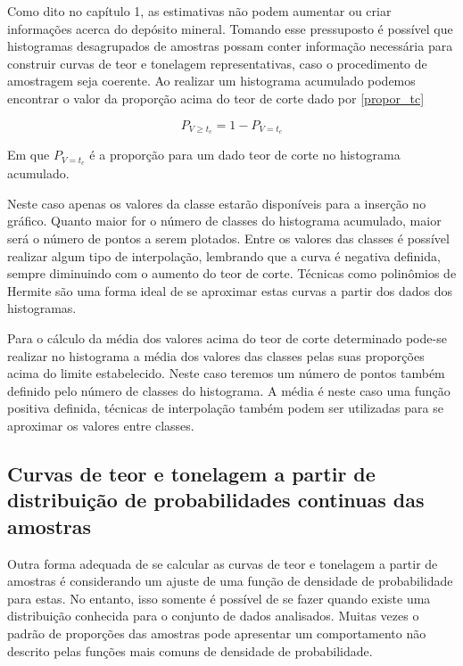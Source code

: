 Como dito no capítulo 1, as estimativas não podem aumentar ou criar informações acerca do depósito mineral. Tomando esse pressuposto é possível que histogramas desagrupados de amostras possam conter informação necessária para construir curvas de teor e tonelagem representativas, caso o procedimento de amostragem seja coerente. Ao realizar um histograma acumulado podemos encontrar o valor da proporção acima do teor de corte dado por \eqref{propor_tc}

\begin{equation}\label{propor_tc}
     P_{V\geq t_{c}} = 1-P_{V = t_{c}}
\end{equation}

Em que $P_{V = t_{c}}$ é a proporção para um dado teor de corte no histograma acumulado.  

Neste caso apenas os valores da classe estarão disponíveis para a inserção no gráfico. Quanto maior for o número de classes do histograma acumulado, maior será o número de pontos a serem plotados. Entre os valores das classes é possível realizar algum tipo de interpolação, lembrando que a curva é negativa definida, sempre diminuindo com o aumento do teor de corte. Técnicas como polinômios de Hermite são uma forma ideal de se aproximar estas curvas a partir dos dados dos histogramas. 

Para o cálculo da média dos valores acima do teor de corte determinado pode-se realizar no histograma a média dos valores das classes pelas suas proporções acima do limite estabelecido. Neste caso teremos um número de pontos também definido pelo número de classes  do histograma. A média é neste caso uma função positiva definida, técnicas de interpolação também podem ser utilizadas para se aproximar os valores entre classes. 

\subsection{Curvas de teor e tonelagem a partir de distribuição de probabilidades continuas das amostras}

Outra forma adequada de se calcular as curvas de teor e tonelagem a partir de amostras é considerando um ajuste de uma função de densidade de probabilidade para estas. No entanto, isso somente é possível de se fazer quando existe uma distribuição conhecida para o conjunto de dados analisados. Muitas vezes o padrão de proporções das amostras pode apresentar um comportamento não descrito pelas funções mais comuns de densidade de probabilidade.

